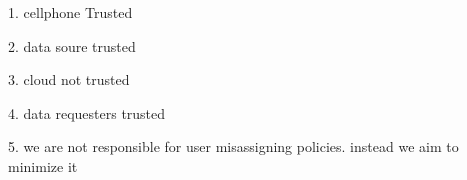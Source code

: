 1. cellphone Trusted

2. data soure trusted

3. cloud not trusted

4. data requesters trusted

5. we are not responsible for user misassigning policies. instead we aim to minimize it